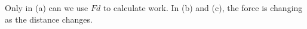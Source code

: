 Only in (a) can we use $Fd$ to calculate work. In (b) and (c), the force is changing
as the distance changes.



